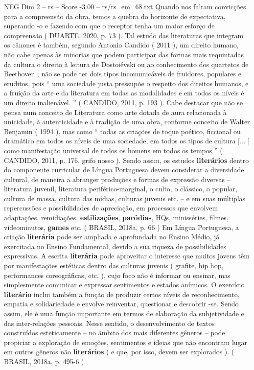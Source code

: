 \begin{textsample}{NEG Dim 2 – rs – Score -3.00 – rs/rs\_em\_68.txt}
Quando nos faltam convicções para a compreensão da obra, temos a quebra do horizonte de expectativa, superando -o e fazendo com que o receptor tenha um maior esforço de compreensão ( DUARTE, 2020, p. 73 ).
Tal estudo das literaturas que integram os cânones é também, segundo Antonio Candido ( 2011 ), um direito humano, não cabe apenas às minorias que podem participar das formas mais requintadas da cultura o direito à leitura de Dostoiévski ou ao conhecimento dos quartetos de Beethoven ; não se pode ter dois tipos incomunicáveis de fruidores, populares e eruditos, pois “ uma sociedade justa pressupõe o respeito dos direitos humanos, e a fruição da arte e da literatura em todas as modalidades e em todos os níveis é um direito inalienável. ” ( CANDIDO, 2011, p. 193 ).
Cabe destacar que não se pensa num conceito de Literatura como arte dotada de aura relacionada à unicidade, à autenticidade e à tradição de uma obra, conforme conceito de Walter Benjamin ( 1994 ), mas como “ todas as criações de toque poético, ficcional ou dramático em todos os níveis de uma sociedade, em todos os tipos de cultura [... ] como manifestação universal de todos os homens em todos os tempos ” ( CANDIDO, 2011, p. 176, grifo nosso ).
Sendo assim, os estudos \textbf{literários} dentro do componente curricular de Língua Portuguesa devem considerar a diversidade cultural, de maneira a abranger produções e formas de expressão diversas – literatura juvenil, literatura periférico-marginal, o culto, o clássico, o popular, cultura de massa, cultura das mídias, culturas juvenis etc. – e em suas múltiplas repercussões e possibilidades de apreciação, em processos que envolvem adaptações, remidiações, \textbf{estilizações}, \textbf{paródias}, HQs, minisséries, filmes, videominutos, \textbf{games} etc. ( BRASIL, 2018a, p. 66 ) Em Língua Portuguesa, a criação \textbf{literária} pode ser ampliada e aprofundada no Ensino Médio, já exercitada no Ensino Fundamental, devido a sua riqueza de possibilidades expressivas.
A escrita \textbf{literária} pode aproveitar o interesse que muitos jovens têm por manifestações estéticas dentro das culturas juvenis ( grafite, hip hop, performances coreográficas, etc. ), cujo foco não é informar ou ensinar, mas simplesmente comunicar e expressar sentimentos e estados anímicos.
O exercício \textbf{literário} inclui também a função de produzir certos níveis de reconhecimento, empatia e solidariedade e envolve reinventar, questionar e descobrir -se.
Sendo assim, ele é uma função importante em termos de elaboração da subjetividade e das inter-relações pessoais.
Nesse sentido, o desenvolvimento de textos construídos esteticamente – no âmbito dos mais diferentes gêneros – pode propiciar a exploração de emoções, sentimentos e ideias que não encontram lugar em outros gêneros não \textbf{literários} ( e que, por isso, devem ser explorados ). ( BRASIL, 2018a, p. 495-6 ).

\end{textsample}
